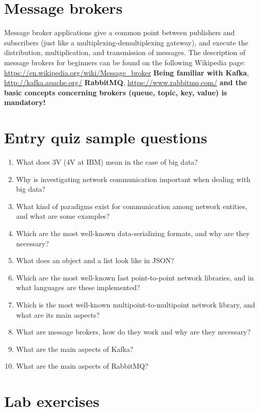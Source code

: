 \documentclass[a4paper]{article}
\begin{document}
\section{Message brokers}
Message broker applications give a common point between publishers and subscribers (just like a
multiplexing-demultiplexing gateway), and execute the distribution, multiplication, and transmission of
messages. The description of message brokers for beginners can be found on the following
Wikipedia page:
\url{https://en.wikipedia.org/wiki/Message_broker}
\textbf{Being familiar with Kafka},
\url{http://kafka.apache.org/}
\textbf{RabbitMQ},
\url{https://www.rabbitmq.com/}
\textbf{and the basic concepts concerning brokers (queue, topic, key, value) is mandatory!}

\appendix

\section{Entry quiz sample questions}

\begin{enumerate}
\item What does 3V (4V at IBM) mean in the case of big data?
\item Why is investigating network communication important when dealing with big data?
\item What kind of paradigms exist for communication among network entities, and what are some examples?
\item Which are the most well-known data-serializing formats, and why are they necessary?
\item What does an object and a list look like in JSON?
\item Which are the most well-known fast point-to-point network libraries, and in what languages are these implemented?
\item Which is the most well-known multipoint-to-multipoint network library, and what are its main aspects?
\item What are message brokers, how do they work and why are they necessary?
\item What are the main aspects of Kafka?
\item What are the main aspects of RabbitMQ?
\end{enumerate}

\section{Lab exercises}
\end{document}

